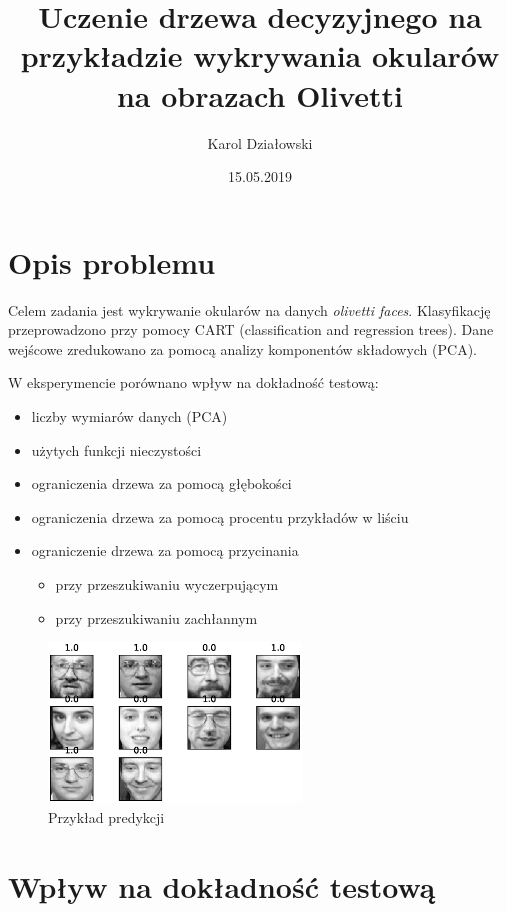 \documentclass[11pt]{article}
\title{Uczenie drzewa decyzyjnego na przykładzie wykrywania okularów na obrazach Olivetti}
\author{Karol Działowski}
\date{15.05.2019}
\begin{document}
\maketitle

\section{Opis problemu}

Celem zadania jest wykrywanie okularów na danych \emph{olivetti faces}. Klasyfikację przeprowadzono przy pomocy CART (classification and regression trees). Dane wejścowe zredukowano za pomocą analizy komponentów składowych (PCA).

W eksperymencie porównano wpływ na dokładność testową:
\begin{itemize}
\item liczby wymiarów danych (PCA)
\item użytych funkcji nieczystości
\item ograniczenia drzewa za pomocą głębokości
\item ograniczenia drzewa za pomocą procentu przykładów w liściu
\item ograniczenie drzewa za pomocą przycinania
\begin{itemize}
\item przy przeszukiwaniu wyczerpującym
\item przy przeszukiwaniu zachłannym
\end{itemize}
\end{itemize}

\begin{figure}[H]
\center
\includegraphics[width=0.6\textwidth]{predictions}
\caption{Przykład predykcji}
\end{figure}

\section{Wpływ na dokładność testową}
\end{document}

